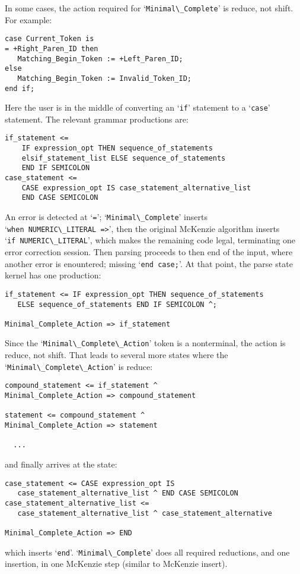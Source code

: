 \documentclass{article}
\newcommand{\code}[1]{`\lstinline|#1|'}
\begin{document}
In some cases, the action required for \code{Minimal\_Complete} is
reduce, not shift. For example:
\begin{lstlisting}
case Current_Token is
= +Right_Paren_ID then
   Matching_Begin_Token := +Left_Paren_ID;
else
   Matching_Begin_Token := Invalid_Token_ID;
end if;
\end{lstlisting}
Here the user is in the middle of converting an \code{if} statement to
a \code{case} statement. The relevant grammar productions are:
\begin{verbatim}
if_statement <=
    IF expression_opt THEN sequence_of_statements
    elsif_statement_list ELSE sequence_of_statements
    END IF SEMICOLON
case_statement <=
    CASE expression_opt IS case_statement_alternative_list
    END CASE SEMICOLON
\end{verbatim}
An error is detected at \code{=}; \code{Minimal\_Complete} inserts\\
\code{when NUMERIC\_LITERAL =>}, then the original McKenzie algorithm
inserts \\\code{if NUMERIC\_LITERAL}, which makes the remaining code
legal, terminating one error correction session. Then parsing proceeds
to then end of the input, where another error is enountered; missing
\code{end case;}. At that point, the parse state kernel has one
production:
\begin{verbatim}
if_statement <= IF expression_opt THEN sequence_of_statements
   ELSE sequence_of_statements END IF SEMICOLON ^;

Minimal_Complete_Action => if_statement
\end{verbatim}
Since the \code{Minimal\_Complete\_Action} token is a nonterminal, the action
is reduce, not shift. That leads to several more states where the\\
\code{Minimal\_Complete\_Action} is reduce:
\begin{verbatim}
compound_statement <= if_statement ^
Minimal_Complete_Action => compound_statement

statement <= compound_statement ^
Minimal_Complete_Action => statement

  ...
\end{verbatim}

and finally arrives at the state:
\begin{verbatim}
case_statement <= CASE expression_opt IS
   case_statement_alternative_list ^ END CASE SEMICOLON
case_statement_alternative_list <=
   case_statement_alternative_list ^ case_statement_alternative

Minimal_Complete_Action => END
\end{verbatim}
which inserts \code{end}. \code{Minimal\_Complete} does all required
reductions, and one insertion, in one McKenzie step (similar to
McKenzie insert).
\end{document}
